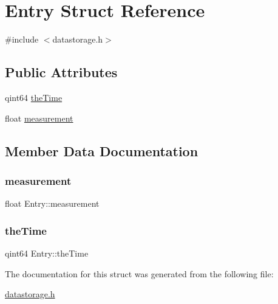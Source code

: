 \hypertarget{struct_entry}{}\section{Entry Struct Reference}
\label{struct_entry}


{\ttfamily \#include $<$datastorage.\+h$>$}

\subsection*{Public Attributes}
\begin{DoxyCompactItemize}
\item 
qint64 \mbox{\hyperlink{struct_entry_a0a78d616ccc342ef6c34d849288d7c85}{the\+Time}}
\item 
float \mbox{\hyperlink{struct_entry_a78ebc6241b1baaa2551b2cf89f519960}{measurement}}
\end{DoxyCompactItemize}


\subsection{Member Data Documentation}
\mbox{\label{struct_entry_a78ebc6241b1baaa2551b2cf89f519960}} 
\subsubsection{\texorpdfstring{measurement}{measurement}}
{\footnotesize\ttfamily float Entry\+::measurement}

\mbox{\label{struct_entry_a0a78d616ccc342ef6c34d849288d7c85}} 
\subsubsection{\texorpdfstring{the\+Time}{theTime}}
{\footnotesize\ttfamily qint64 Entry\+::the\+Time}



The documentation for this struct was generated from the following file\+:\begin{DoxyCompactItemize}
\item 
\mbox{\hyperlink{datastorage_8h}{datastorage.\+h}}\end{DoxyCompactItemize}
